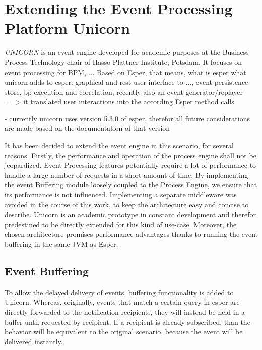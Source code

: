 \section{Extending the Event Processing Platform Unicorn}\label{ch:implunicorn}
\textit{UNICORN} is an event engine developed for academic purposes at the Business Process Technology chair of Hasso-Plattner-Institute, Potsdam.
\cite{herzberg2013event}
It focuses on event processing for \acs{BPM}, ...
Based on Esper, that means, what is esper
what unicorn adds to esper: graphical and rest user-interface to ..., event persistence store, bp execution and correlation, recently also an event generator/replayer
==> it translated user interactions into the according Esper method calls

- currently unicorn uses version 5.3.0 of esper, therefor all future considerations are made based on the documentation of that version

It has been decided to extend the event engine in this scenario, for several reasons.
Firstly, the performance and operation of the process engine shall not be jeopardized. Event Processing features potentially require a lot of performance to handle a large number of requests in a short amount of time.
By implementing the event Buffering module loosely coupled to the Process Engine, we ensure that its performance is not influenced.
Implementing a separate middleware was avoided in the course of this work, to keep the architecture easy and concise to describe.
Unicorn is an academic prototype in constant development and therefor predestined to be directly extended for this kind of use-case.
Moreover, the chosen architecture promises performance advantages thanks to running the event buffering in the same \acs{JVM} as Esper.


\subsection{Event Buffering}
To allow the delayed delivery of events, buffering functionality is added to Unicorn.
Whereas, originally, events that match a certain query in esper are directly forwarded to the notification-recipients, they will instead be held in a buffer until requested by recipient. 
If a recipient is already subscribed, than the behavior will be equivalent to the original scenario, because the event will be delivered instantly.

